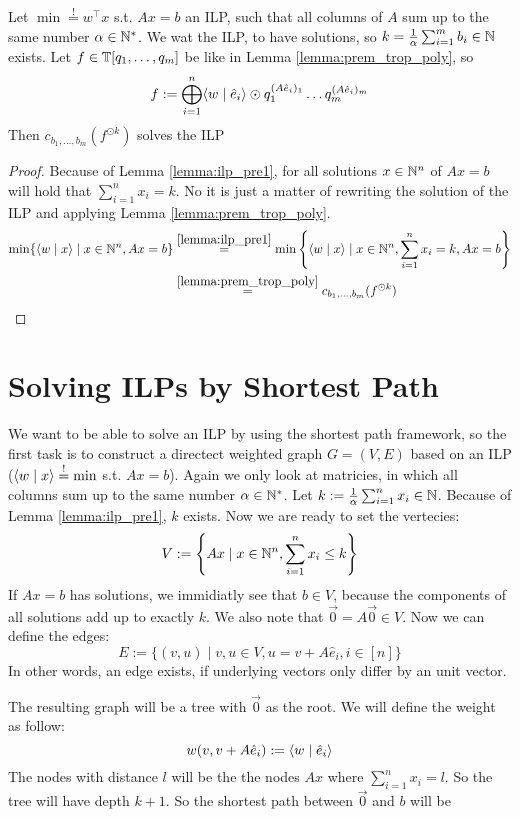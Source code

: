 \begin{theorem}
    Let $\min \stackrel{!}{=} w^\top x$ s.t. $Ax=b$ an ILP, such that all columns of $A$ sum up to the same number $\alpha \in \mathbb{N}^*$. We wat the ILP, to have solutions, so $k = \frac{1}{\alpha}\sum_{i=1}^{m}b_i \in \mathbb{N}$ exists. Let $f \in \mathbb{T}[q_1, \dots, q_m]$ be like in Lemma \ref{lemma:prem_trop_poly}, so 
    $$f := \bigoplus_{i=1}^{n} \langle w \mid \hat e_i \rangle\odot  q_1^{(A\hat e_i)_1}\dots q_m^{(A\hat e_i)_m}$$
    Then $c_{b_1, \dots, b_m}(f^{\odot k})$ solves the ILP 
\end{theorem}

\begin{proof}
    Because of Lemma \ref{lemma:ilp_pre1}, for all solutions $x \in \mathbb{N}^n$ of $Ax=b$ will hold that $\sum_{i=1}^{n}x_i = k$. No it is just a matter of rewriting the solution of the ILP and applying Lemma \ref{lemma:prem_trop_poly}.
    \begin{align*}
        \min\{\langle w \mid x \rangle \mid x \in \mathbb{N}^n, Ax=b\} &\stackrel{\ref{lemma:ilp_pre1}}{=} \min\left\{\langle w \mid x \rangle \mid x \in \mathbb{N}^n, \sum_{i=1}^{n}x_i = k , Ax=b\right\}\\
        &\stackrel{\ref{lemma:prem_trop_poly}}{=} c_{b_1, \dots, b_m}(f^{\odot k})
    \end{align*}
\end{proof}

\section{Solving ILPs by Shortest Path}
We want to be able to solve an ILP by using the shortest path framework, so the first task is to construct a directect weighted graph $G = (V, E)$ based on an ILP ($\langle w \mid x \rangle \stackrel{!}{=} \min$ s.t. $Ax=b$). Again we only look at matricies, in which all columns sum up to the same number $\alpha \in \mathbb{N}^*$. Let $k := \frac{1}{\alpha} \sum_{i=1}^{n}x_i \in \mathbb{N}$. Because of Lemma \ref{lemma:ilp_pre1}, $k$ exists. Now we are ready to set the vertecies:
$$V := \left\{Ax \mid x \in \mathbb{N}^n, \sum_{i=1}^{n} x_i \leq k \right\}$$ 
If $Ax=b$ has solutions, we immidiatly see that $b \in V$, because the components of all solutions add up to exactly $k$. We also note that $\vec 0 = A\vec 0 \in V$. Now we can define the edges:
$$E := \{(v, u) \mid v, u \in V, u = v + A\hat e_i, i \in [n]\}$$
In other words, an edge exists, if underlying vectors only differ by an unit vector.

The resulting graph will be a tree with $\vec 0$ as the root. We will define the weight as follow:
$$w(v, v + A\hat e_i) := \langle w \mid \hat e_i \rangle$$
The nodes with distance $l$ will be the the nodes $Ax$ where $\sum_{i=1}^{n}x_i = l$. So the tree will have depth $k+1$. So the shortest path between $\vec 0$ and $b$ will be 

